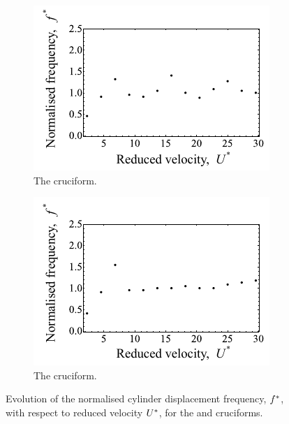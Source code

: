 \documentclass[oneside]{utmthesis}
\begin{document}
\begin{figure}
  \centering
  \begin{subfigure}[h]{0.4\textwidth}
    \includegraphics[width=\textwidth]{figs/yStrFreq4}
    \caption{The \angfo{} cruciform.}
    \label{fig:yStrFreq4}
  \end{subfigure}
  \hspace{6mm}
  \begin{subfigure}[h]{0.4\textwidth}
    \includegraphics[width=\textwidth]{figs/yStrFreq3}
    \caption{The \angth{} cruciform.}
    \label{fig:yStrFreq3}
  \end{subfigure}

  \caption{Evolution of the normalised cylinder displacement frequency, $f^{*}$, with respect to reduced velocity $U^{*}$, for the \angfo{} and \angth{} cruciforms.}
  \label{fig:yStrFreq43}
\end{figure}
\end{document}
